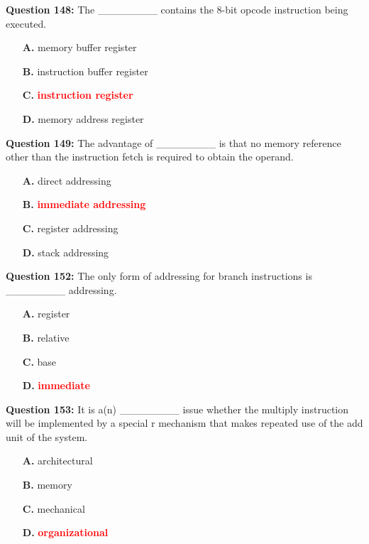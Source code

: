 \documentclass[12pt,a4paper]{article}
\begin{document}
\vspace{0.5cm}

\textbf{Question 148:} The ________ contains the 8-bit opcode instruction being executed.

\begin{itemize}
    \item[\textbf{A.}] memory buffer register
    \item[\textbf{B.}] instruction buffer register
    \item[\textbf{C.}] \textcolor{red}{\textbf{instruction register}}
    \item[\textbf{D.}] memory address register
\end{itemize}

\vspace{0.5cm}

\textbf{Question 149:} The advantage of ________ is that no memory reference other than the instruction fetch is required to obtain the operand.

\begin{itemize}
    \item[\textbf{A.}] direct addressing
    \item[\textbf{B.}] \textcolor{red}{\textbf{immediate addressing}}
    \item[\textbf{C.}] register addressing
    \item[\textbf{D.}] stack addressing
\end{itemize}

\vspace{0.5cm}

\textbf{Question 152:} The only form of addressing for branch instructions is ________ addressing.

\begin{itemize}
    \item[\textbf{A.}] register
    \item[\textbf{B.}] relative
    \item[\textbf{C.}] base
    \item[\textbf{D.}] \textcolor{red}{\textbf{immediate}}
\end{itemize}

\vspace{0.5cm}

\textbf{Question 153:} It is a(n) ________ issue whether the multiply instruction will be implemented by a special r mechanism that makes repeated use of the add unit of the system.

\begin{itemize}
    \item[\textbf{A.}] architectural
    \item[\textbf{B.}] memory
    \item[\textbf{C.}] mechanical
    \item[\textbf{D.}] \textcolor{red}{\textbf{organizational}}
\end{itemize}
\end{document}
